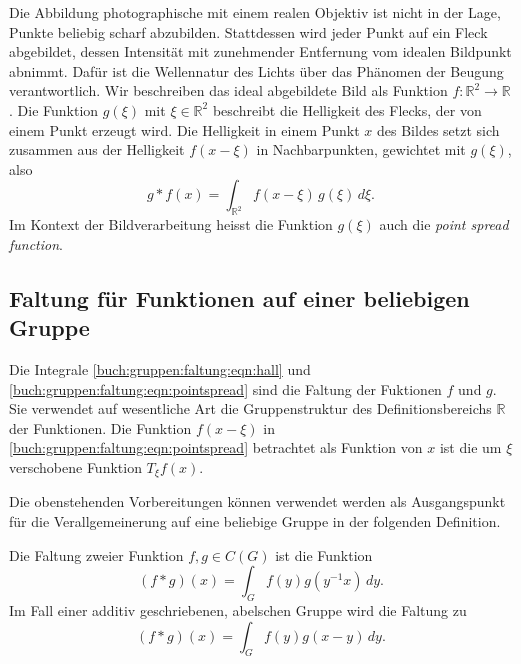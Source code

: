 Die Abbildung photographische mit einem realen Objektiv ist nicht
in der Lage, Punkte beliebig scharf abzubilden.
Stattdessen wird jeder Punkt auf ein Fleck abgebildet, dessen Intensität
mit zunehmender Entfernung vom idealen Bildpunkt abnimmt.
Dafür ist die Wellennatur des Lichts über das Phänomen der Beugung
verantwortlich.
Wir beschreiben das ideal abgebildete Bild als Funktion
$f\colon\mathbb{R}^2\to\mathbb{R}$.
Die Funktion $g(\xi)$ mit $\xi\in\mathbb{R}^2$ beschreibt die
Helligkeit des Flecks, der von einem Punkt erzeugt wird.
Die Helligkeit in einem Punkt $x$ des Bildes setzt sich zusammen
aus der Helligkeit $f(x-\xi)$ in Nachbarpunkten, gewichtet mit
$g(\xi)$, also
\begin{equation}
g*f(x)
=
\int_{\mathbb{R}^2} f(x-\xi)\,g(\xi)\,d\xi.
\label{buch:gruppen:faltung:eqn:pointspread}
\end{equation}
Im Kontext der Bildverarbeitung heisst
die Funktion $g(\xi)$ auch die {\em point spread function}.

%
%
\subsection{Faltung für Funktionen auf einer beliebigen Gruppe}
Die Integrale \eqref{buch:gruppen:faltung:eqn:hall} und
\eqref{buch:gruppen:faltung:eqn:pointspread} sind die Faltung
der Fuktionen $f$ und $g$.
Sie verwendet auf wesentliche Art die Gruppenstruktur des
Definitionsbereichs $\mathbb{R}$ der Funktionen.
Die Funktion $f(x-\xi)$ in \eqref{buch:gruppen:faltung:eqn:pointspread}
betrachtet als Funktion von $x$ ist die um $\xi$ verschobene
Funktion $T_\xi f(x)$.

Die obenstehenden Vorbereitungen können verwendet werden als
Ausgangspunkt für die Verallgemeinerung auf eine beliebige Gruppe
in der folgenden Definition.

\begin{definition}
Die Faltung zweier Funktion $f,g\in C(G)$ ist die Funktion
\begin{equation}
(f*g)(x)
=
\int_G f(y)g(y^{-1}x)\,dy.
\label{buch:gruppen:faltung:eqn:deffaltung}
\end{equation}
Im Fall einer additiv geschriebenen, abelschen Gruppe wird die Faltung zu
\begin{equation}
(f*g)(x)
=
\int_G f(y)g(x-y)\,dy.
\label{buch:gruppen:faltung:eqn:deffaltungadditiv}
\end{equation}
\end{definition}


